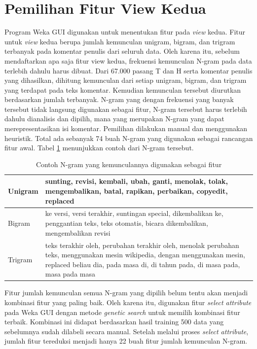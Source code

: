 \section{Pemilihan Fitur View Kedua} \label{sec:uji-fitur2}
Program Weka GUI digunakan untuk menentukan fitur pada \textit{view} kedua. Fitur untuk \textit{view} kedua berupa jumlah kemunculan unigram, bigram, dan trigram terbanyak pada komentar penulis dari seluruh data. Oleh karena itu, sebelum mendaftarkan apa saja fitur view kedua, frekuensi kemunculan N-gram pada data terlebih dahulu harus dibuat. 
Dari 67.000 pasang T dan H serta komentar penulis yang dihasilkan, dihitung kemunculan dari setiap unigram, bigram, dan trigram yang terdapat pada teks komentar. Kemudian kemunculan tersebut diurutkan berdasarkan jumlah terbanyak. N-gram yang dengan frekuensi yang banyak tersebut tidak langsung digunakan sebagai fitur, N-gram tersebut harus terlebih dahulu dianalisis dan dipilih, mana yang merupakan N-gram yang dapat merepresentasikan isi komentar. Pemilihan dilakukan manual dan menggunakan heuristik. Total ada sebanyak 74 buah N-gram yang digunakan sebagai rancangan fitur awal. Tabel \ref{table:n-gram} menunjukkan contoh dari N-gram tersebut.
\begin{table}
	\centering
	\caption{Contoh N-gram yang kemunculannya digunakan sebagai fitur}
	\label{table:n-gram}
	\begin{tabular}{|p{3cm}|p{9cm}|}
		\hline
		Unigram & sunting, revisi, kembali, ubah, ganti, menolak, tolak, mengembalikan, batal, rapikan, perbaikan, copyedit, replaced \\ \hline
		Bigram & ke versi, versi terakhir, suntingan special, dikembalikan ke, penggantian teks, teks otomatis, bicara dikembalikan, mengembalikan revisi \\ \hline		
		Trigram & teks terakhir oleh, perubahan terakhir oleh, menolak perubahan teks, menggunakan mesin wikipedia, dengan menggunakan mesin, replaced beliau dia, pada masa di, di tahun pada, di masa pada, masa pada masa \\ \hline
	\end{tabular}
\end{table}
Fitur jumlah kemunculan semua N-gram yang dipilih belum tentu akan menjadi kombinasi fitur yang paling baik. Oleh karena itu, digunakan fitur  \textit{select attribute} pada Weka GUI dengan metode \textit{genetic search} untuk memilih kombinasi fitur terbaik. Kombinasi ini didapat berdasarkan hasil training 500 data yang sebelumnya sudah dilabeli secara manual. Setelah melalui proses \textit{select attribute}, jumlah fitur tereduksi menjadi hanya 22 buah fitur jumlah kemunculan N-gram. 


